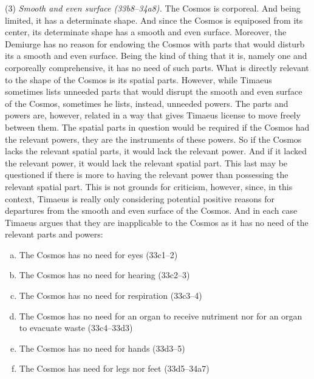 (3) \emph{Smooth and even surface (33b8--34a8).} The Cosmos is corporeal. And being limited, it has a determinate shape. And since the Cosmos is equiposed from its center, its determinate shape has a smooth and even surface. Moreover, the Demiurge has no reason for endowing the Cosmos with parts that would disturb its a smooth and even surface. Being the kind of thing that it is, namely one and corporeally comprehensive, it has no need of such parts. What is directly relevant to the shape of the Cosmos is its spatial parts. However, while Timaeus sometimes lists unneeded parts that would disrupt the smooth and even surface of the Cosmos, sometimes he lists, instead, unneeded powers. The parts and powers are, however, related in a way that gives Timaeus license to move freely between them. The spatial parts in question would be required if the Cosmos had the relevant powers, they are the instruments of these powers. So if the Cosmos lacks the relevant spatial parts, it would lack the relevant power. And if it lacked the relevant power, it would lack the relevant spatial part. This last may be questioned if there is more to having the relevant power than possessing the relevant spatial part. This is not grounds for criticism, however, since, in this context, Timaeus is really only considering potential positive reasons for departures from the smooth and even surface of the Cosmos. And in each case Timaeus argues that they are inapplicable to the Cosmos as it has no need of the relevant parts and powers:
\begin{enumerate}[(a)]
	\item The Cosmos has no need for eyes (33c1--2)
	\item The Cosmos has no need for hearing (33c2--3)
	\item The Cosmos has no need for respiration (33c3--4)
	\item The Cosmos has no need for an organ to receive nutriment nor for an organ to evacuate waste (33c4--33d3)
	\item The Cosmos has no need for hands (33d3--5)
	\item The Cosmos has need for legs nor feet (33d5--34a7)
\end{enumerate}


